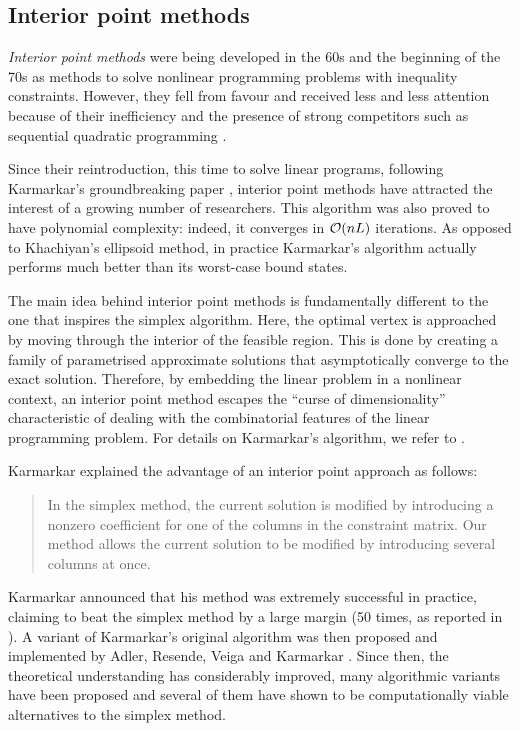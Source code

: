 %
%
\subsection{Interior point methods}

{\em Interior point methods} were being developed in the 60s and the 
beginning of the 70s as methods to solve nonlinear programming problems 
with inequality constraints. 
However, they fell from favour and received less and less attention
because of their inefficiency and the presence of strong competitors
such as sequential quadratic programming \cite{MWright92}.

Since their reintroduction, this time to solve linear programs, 
following Karmarkar's groundbreaking paper
\cite{Karmarkar}, interior point methods have attracted 
the interest of a growing number of researchers.
This algorithm was also proved to have polynomial complexity: 
indeed, it converges in $\mathcal{O}(nL)$ iterations. As opposed to
Khachiyan's ellipsoid method, in practice Karmarkar's algorithm actually
performs much better than its worst-case bound states.

The main idea behind interior point methods is fundamentally different 
to the one that inspires the simplex algorithm. Here, the optimal vertex 
is approached by moving through the interior of the feasible region.
This is done by creating a family of parametrised approximate solutions
that asymptotically converge to the exact solution.
Therefore, by embedding the linear problem in a nonlinear context,
an interior point method escapes the ``curse of dimensionality''
characteristic of dealing with the combinatorial features of the 
linear programming problem.
For details on Karmarkar's algorithm, we refer to
\cite[Chapter~6]{FangPuthenpura93}.

Karmarkar \cite{Karmarkar} explained the advantage of an
interior point approach as follows:
\begin{quotation}
In the simplex method, the current solution is modified by introducing
a nonzero coefficient for one of the columns in the constraint
matrix. Our method allows the current solution to be modified by
introducing several columns at once.
\end{quotation}


Karmarkar announced that his method was extremely successful in practice, 
claiming to beat the simplex method by a large margin (50 times,
as reported in \cite{MWright92}).
A variant of Karmarkar's original algorithm was then proposed and 
implemented by Adler, Resende, Veiga and Karmarkar 
\cite{AdlerResendeVeigaKarmarkar89}.
Since then, the theoretical understanding has considerably improved,
many algorithmic variants have been proposed and several of
them have shown to be computationally viable alternatives to the
simplex method.

